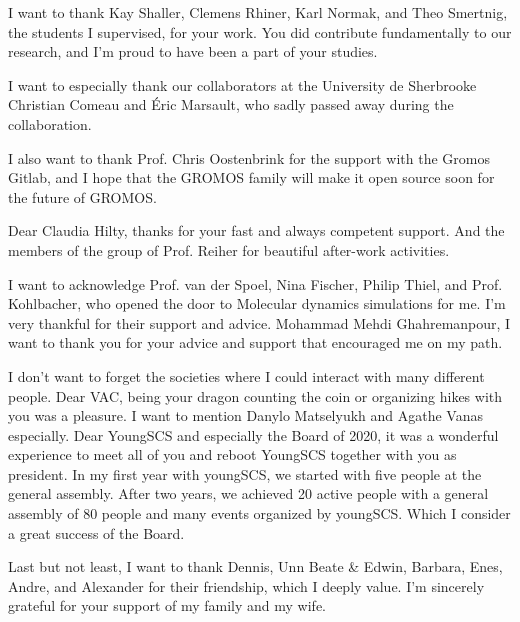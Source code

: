 I want to thank Kay Shaller, Clemens Rhiner, Karl Normak, and Theo Smertnig, the students I supervised, for your work. You did contribute fundamentally to our research, and I'm proud to have been a part of your studies.

I want to especially thank our collaborators at the University de Sherbrooke Christian Comeau and {\' E}ric Marsault, who sadly passed away during the collaboration.

I also want to thank Prof. Chris Oostenbrink for the support with the Gromos Gitlab, and I hope that the GROMOS family will make it open source soon for the future of GROMOS.


Dear Claudia Hilty, thanks for your fast and always competent support. And the members of the group of Prof. Reiher for beautiful after-work activities.

I want to acknowledge Prof. van der Spoel, Nina Fischer, Philip Thiel, and Prof. Kohlbacher, who opened the door to Molecular dynamics simulations for me. I'm very thankful for their support and advice.  
Mohammad Mehdi Ghahremanpour, I want to thank you for your advice and support that encouraged me on my path.

I don't want to forget the societies where I could interact with many different people.
Dear VAC, being your dragon counting the coin or organizing hikes with you was a pleasure. I want to mention Danylo Matselyukh and Agathe Vanas especially. 
Dear YoungSCS and especially the Board of 2020, it was a wonderful experience to meet all of you and reboot YoungSCS together with you as president. In my first year with youngSCS, we started with five people at the general assembly. After two years, we achieved 20 active people with a general assembly of 80 people and many events organized by youngSCS. Which I consider a great success of the Board.

Last but not least, I want to thank Dennis, Unn Beate \& Edwin, Barbara, Enes, Andre, and Alexander for their friendship, which I deeply value.
I'm sincerely grateful for your support of my family and my wife.

\begin{center}
    \begin{minipage}[t]{.5\linewidth}
    \end{minipage}
\end{center}
